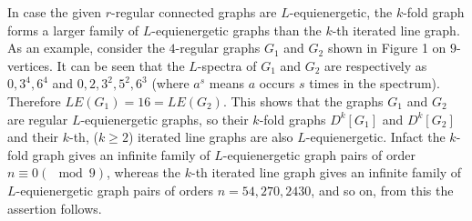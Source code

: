 \documentclass[12pt,a4paper]{amsart}
\theoremstyle{theorem}
\theoremstyle{definition}
\numberwithin{equation}{section} \makeatletter
\begin{document}
\indent In case the given $r$-regular connected graphs are $L$-equienergetic, the $k$-fold graph forms a larger family of $L$-equienergetic graphs than the $k$-th iterated line graph. As an example, consider the $4$-regular graphs $G_1$ and $G_2$ shown in Figure 1 on $9$-vertices. It can be seen that the $L$-spectra of $G_1$ and $G_2$ are respectively as $0, 3^4, 6^4$ and $0, 2, 3^2, 5^2, 6^3$ (where $a^s$ means $a$ occurs $s$ times in the spectrum). Therefore $LE(G_1)=16=LE(G_2)$. This shows that the graphs  $G_1$ and $G_2$ are regular $L$-equienergetic graphs, so their $k$-fold graphs $D^k[G_1]$ and $D^k[G_2]$ and their $k$-th, ($k \geq 2$) iterated line graphs are also $L$-equienergetic. Infact the $k$-fold graph gives an infinite family of $L$-equienergetic graph pairs of order $n\equiv 0(\mod 9)$, whereas the $k$-th iterated line graph gives an infinite family of $L$-equienergetic graph pairs of orders $n=54, 270, 2430$, and so on, from this the assertion follows.\\
\end{document}
